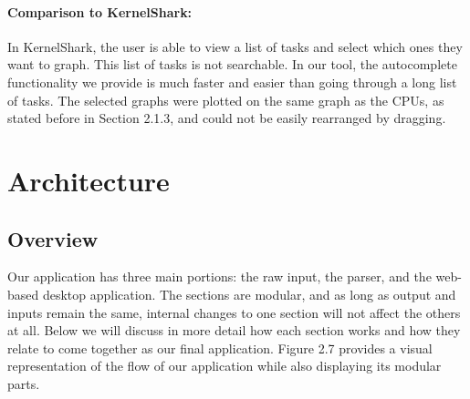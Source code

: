\documentclass{hmcclinic}
\begin{document}
\paragraph{Comparison to KernelShark:}
    In KernelShark, the user is able to view a list of tasks and select which
    ones they want to graph.  This list of tasks is not searchable. In our tool,
    the autocomplete functionality we provide is much faster and easier than
    going through a long list of tasks. The selected graphs were plotted on the
    same graph as the CPUs, as stated before in Section 2.1.3, and could not be
    easily rearranged by dragging.

\section{Architecture} %

  \subsection{Overview}

  Our application has three main portions: the raw input, the parser,
  and the web-based desktop application. The sections are modular, and
  as long as output and inputs remain the same, internal changes to one section will
  not affect the others at all. Below we will discuss in more detail how each
  section works and how they relate to come together as our final application.
  Figure 2.7 provides a visual representation of the flow of our application
  while also displaying its modular parts.
  
\end{document}
